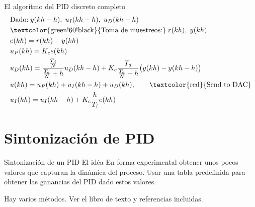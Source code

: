 \documentclass[presentation,aspectratio=1610]{beamer}
\begin{document}
\begin{frame}[label={sec:orgb9a4128}]{El algoritmo del PID discreto completo}
\begin{align*}
&\text{Dado:}  \;  y(kh-h), \; u_I(kh-h), \; u_D(kh-h)\\
& \text{\textcolor{green!60!black}{Toma de muestreos:}} \; r(kh), \; y(kh)\\
&e(kh) = r(kh) - y(kh)\\
&u_P(kh) = K_ce(kh)\\
&u_D(kh) = \frac{\frac{T_d}{N}}{\frac{T_d}{N} + h}u_D(kh-h) + K_c\frac{T_d}{\frac{T_d}{N} + h}\big(y(kh) - y(kh-h)\big)\\
&u(kh) = u_P(kh) + u_I(kh-h) + u_D(kh), \qquad \text{\textcolor{red}{Send to DAC}}\\
&u_I(kh) = u_I(kh-h) + K_c \frac{h}{T_i} e(kh)
\end{align*}

\begin{center}
\end{center}
\end{frame}

\section{Sintonización de PID}
\label{sec:org09fad4a}
\begin{frame}[label={sec:org70fd43e}]{Sintonización de un PID}
\alert{El idéa} En forma experimental obtener unos pocos valores que capturan la dinámica del proceso. Usar una tabla predefinida para obtener las ganancias del PID dado estos valores.

Hay varios métodos. Ver el libro de texto y referencias incluidas.
\end{frame}
\end{document}
